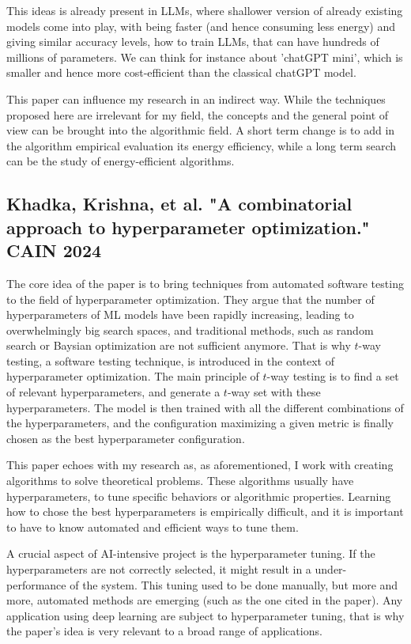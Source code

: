 \documentclass[11pt]{article}
\begin{document}
This ideas is already present in LLMs, where shallower version of already existing models come into play, with being faster (and hence consuming less energy) and giving similar accuracy levels, how to train LLMs, that can have hundreds of millions of parameters. We can think for instance about 'chatGPT mini', which is smaller and hence more cost-efficient than the classical chatGPT model.

\medskip

This paper can influence my research in an indirect way. While the techniques proposed here are irrelevant for my field, the concepts and the general point of view can be brought into the algorithmic field. A short term change is to add in the algorithm empirical evaluation its energy efficiency, while a long term search can be the study of energy-efficient algorithms.

\medskip

\subsection{Khadka, Krishna, et al. "A combinatorial approach to hyperparameter optimization." CAIN 2024}
The core idea of the paper is to bring techniques from automated software testing to the field of hyperparameter optimization. They argue that the number of hyperparameters of ML models have been rapidly increasing, leading to overwhelmingly big search spaces, and traditional methods, such as random search or Baysian optimization are not sufficient anymore. That is why $t$-way testing, a software testing technique, is introduced in the context of hyperparameter optimization.  The main principle of $t$-way testing is to find a set of relevant hyperparameters, and generate a $t$-way set with these hyperparameters. The model is then trained with all the different combinations of the hyperparameters, and the configuration maximizing a given metric is finally chosen as the best hyperparameter configuration.

\medskip

This paper echoes with my research as, as aforementioned, I work with creating algorithms to solve theoretical problems. These algorithms usually have hyperparameters, to tune specific behaviors or algorithmic properties. Learning how to chose the best hyperparameters is empirically difficult, and it is important to have to know automated and efficient ways to tune them.

\medskip

A crucial aspect of AI-intensive project is the hyperparameter tuning. If the hyperparameters are not correctly selected, it might result in a under-performance of the system. This tuning used to be done manually, but more and more, automated methods are emerging (such as the one cited in the paper). Any application using deep learning are subject to hyperparameter tuning, that is why the paper's idea is very relevant to a broad range of applications.
\end{document}
